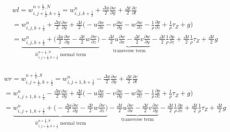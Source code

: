 \documentclass{article}
\numberwithin{equation}{subsection}
\begin{document}
\begin{align}
\begin{split}
& wl = w_{i,j+\frac{1}{2},k+\frac{1}{2}}^{n+\frac{1}{2},N} = w_{i,j,k+\frac{1}{2}}^n + \frac{\Delta y}{2}\frac{\partial w}{\partial y} + \frac{\Delta t}{2}\frac{\partial v}{\partial t} \\
&= w_{i,j,k+\frac{1}{2}}^n + \frac{\Delta y}{2} \frac{\partial w}{\partial y} + \frac{\Delta t}{2} \Big( -u\frac{\partial w}{\partial x} -v\frac{\partial w}{\partial y} -w\frac{\partial w}{\partial z} - \frac{1}{\rho}\frac{\partial p}{\partial z} +\frac{1}{\rho}\tau_Z + g\Big) \\
&= \underbrace{w_{i,j,k+\frac{1}{2}}^n + \Big(\frac{\Delta y}{2}\frac{\partial w}{\partial y} - \frac{\Delta t}{2} w\frac{\partial w}{\partial z}\Big)}_\text{$\widehat{w}_{i,j+\frac{1}{2},k+\frac{1}{2}}^{n+\frac{1}{2},N}$ normal term} -\underbrace{\frac{\Delta t}{2}u\frac{\partial w}{\partial x} - \frac{\Delta t}{2}v\frac{\partial w}{\partial y}}_\text{transverse term} - \frac{\Delta t}{2}\frac{1}{\rho}\frac{\partial p}{\partial z} + \frac{\Delta t}{2}\frac{1}{\rho}\tau_Z + \frac{\Delta t}{2}g
\end{split}
\end{align}

\begin{align}
\begin{split}
& wr = w_{i,j+\frac{1}{2},k+\frac{1}{2}}^{n+\frac{1}{2},S} = w_{i,j+1,k+\frac{1}{2}}^n - \frac{\Delta y}{2}\frac{\partial w}{\partial y} + \frac{\Delta t}{2}\frac{\partial v}{\partial t} \\
&= w_{i,j+1,k+\frac{1}{2}}^n - \frac{\Delta y}{2} \frac{\partial w}{\partial y} + \frac{\Delta t}{2} \Big( -u\frac{\partial w}{\partial x} -v\frac{\partial w}{\partial y} -w\frac{\partial w}{\partial z} - \frac{1}{\rho}\frac{\partial p}{\partial z} +\frac{1}{\rho}\tau_Z + g\Big) \\
&= \underbrace{w_{i,j+1,k+\frac{1}{2}}^n + \Big(-\frac{\Delta y}{2}\frac{\partial w}{\partial y} - \frac{\Delta t}{2} w\frac{\partial w}{\partial z}\Big)}_\text{$\widehat{w}_{i,j+\frac{1}{2},k+\frac{1}{2}}^{n+\frac{1}{2},S}$ normal term} -\underbrace{\frac{\Delta t}{2}u\frac{\partial w}{\partial x} - \frac{\Delta t}{2}v\frac{\partial w}{\partial y}}_\text{transverse term} - \frac{\Delta t}{2}\frac{1}{\rho}\frac{\partial p}{\partial z} + \frac{\Delta t}{2}\frac{1}{\rho}\tau_Z + \frac{\Delta t}{2}g
\end{split}
\end{align}
\end{document}
